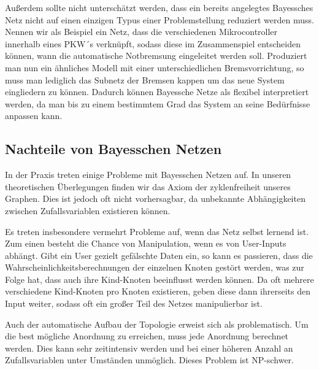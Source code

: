 Außerdem sollte nicht unterschätzt werden, dass ein bereits angelegtes Bayessches Netz nicht auf einen einzigen Typus einer
Problemstellung reduziert werden muss. Nennen wir als Beispiel ein Netz, dass die verschiedenen Mikrocontroller innerhalb eines
PKW´s verknüpft, sodass diese im Zusammenspiel entscheiden können, wann die automatische Notbremsung eingeleitet werden soll.
Produziert man nun ein ähnliches Modell mit einer unterschiedlichen Bremsvorrichtung, so muss man lediglich das Subnetz der
Bremsen kappen um das neue System eingliedern zu können.   
Dadurch können Bayessche Netze als flexibel interpretiert werden, da man bis zu einem bestimmtem Grad das System an seine 
Bedürfnisse anpassen kann.

\subsection{Nachteile von Bayesschen Netzen}			
In der Praxis treten einige Probleme mit Bayesschen Netzen auf. In unseren theoretischen Überlegungen finden wir das Axiom
der zyklenfreiheit unseres Graphen. Dies ist jedoch oft nicht vorhersagbar, da unbekannte Abhängigkeiten zwischen Zufallsvariablen
existieren können. 

Es treten insbesondere vermehrt Probleme auf, wenn das Netz selbst lernend ist.
Zum einen besteht die Chance von Manipulation, wenn es von User-Inputs abhängt. Gibt ein User gezielt gefälschte Daten ein, 
so kann es passieren, dass die Wahrscheinlichkeitsberechnungen der einzelnen Knoten gestört werden, was zur Folge hat, dass 
auch ihre Kind-Knoten beeinflusst werden können. Da oft mehrere verschiedene Kind-Knoten pro Knoten existieren,  geben diese
dann ihrerseits den Input weiter, sodass oft ein großer Teil des Netzes manipulierbar ist.

Auch der automatische Aufbau der Topologie erweist sich als problematisch. Um die best mögliche Anordnung zu erreichen, muss 
jede Anordnung berechnet werden. Dies kann sehr zeitintensiv werden und bei einer höheren Anzahl an Zufallsvariablen unter 
Umständen unmöglich. Dieses Problem ist NP-schwer.


